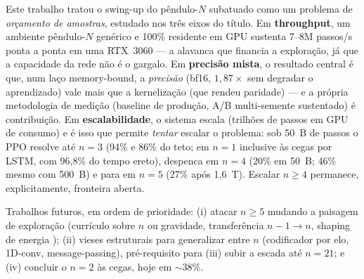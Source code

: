 \documentclass[12pt]{article}
\begin{document}
Este trabalho tratou o swing-up do pêndulo-$N$ subatuado como um problema de
\emph{orçamento de amostras}, estudado nos três eixos do título. Em
\textbf{throughput}, um ambiente pêndulo-$N$ genérico e 100\% residente em GPU
sustenta 7--8M passos/s ponta a ponta em uma RTX~3060 --- a alavanca que
financia a exploração, já que a capacidade da rede não é o gargalo. Em
\textbf{precisão mista}, o resultado central é que, num laço memory-bound, a
\emph{precisão} (bf16, $1{,}87\times$ sem degradar o aprendizado) vale mais
que a kernelização (que rendeu paridade) --- e a própria
metodologia de medição (baseline de produção, A/B multi-semente sustentado) é
contribuição. Em \textbf{escalabilidade}, o sistema escala (trilhões de passos
em GPU de consumo) e é isso que permite \emph{tentar} escalar o problema: sob
50~B de passos o PPO resolve até $n{=}3$ (94\% e 86\% do teto; em $n{=}1$
inclusive às cegas por LSTM, com 96,8\% do tempo ereto), despenca em $n{=}4$
(20\% em 50~B; 46\% mesmo com 500~B) e para em $n{=}5$ (27\% após 1,6~T).
Escalar $n \geq 4$ permanece, explicitamente, fronteira aberta.

Trabalhos futuros, em ordem de prioridade: (i) atacar $n \geq 5$ mudando a
paisagem de exploração (currículo sobre $n$ ou gravidade, transferência
$n{-}1 \to n$, shaping de energia \cite{astrom2000}); (ii) vieses estruturais
para generalizar entre $n$ (codificador por elo, 1D-conv, message-passing),
pré-requisito para (iii) subir a escada até $n{=}21$; e (iv) concluir o
$n{=}2$ às cegas, hoje em ${\sim}38\%$.
\end{document}
